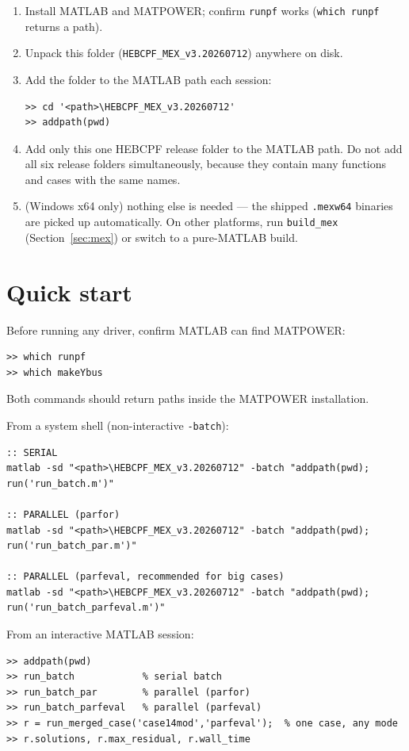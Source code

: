 \documentclass[11pt,a4paper]{article}
\newcommand{\code}[1]{\texttt{#1}}
\begin{document}
\begin{enumerate}[leftmargin=1.6em]
  \item Install MATLAB and MATPOWER; confirm \code{runpf} works
        (\code{which runpf} returns a path).
  \item Unpack this folder (\code{HEBCPF_MEX_v3.20260712}) anywhere on disk.
  \item Add the folder to the MATLAB path each session:
\begin{lstlisting}
>> cd '<path>\HEBCPF_MEX_v3.20260712'
>> addpath(pwd)
\end{lstlisting}
  \item Add only this one HEBCPF release folder to the MATLAB path. Do not add all six
        release folders simultaneously, because they contain many functions and cases with
        the same names.
  \item (Windows x64 only) nothing else is needed --- the shipped \code{.mexw64} binaries
        are picked up automatically. On other platforms, run \code{build_mex}
        (Section~\ref{sec:mex}) or switch to a pure-MATLAB build.
\end{enumerate}

\section{Quick start}

Before running any driver, confirm MATLAB can find MATPOWER:
\begin{lstlisting}[style=mat]
>> which runpf
>> which makeYbus
\end{lstlisting}
Both commands should return paths inside the MATPOWER installation.

From a system shell (non-interactive \code{-batch}):
\begin{lstlisting}[style=sh]
:: SERIAL
matlab -sd "<path>\HEBCPF_MEX_v3.20260712" -batch "addpath(pwd); run('run_batch.m')"

:: PARALLEL (parfor)
matlab -sd "<path>\HEBCPF_MEX_v3.20260712" -batch "addpath(pwd); run('run_batch_par.m')"

:: PARALLEL (parfeval, recommended for big cases)
matlab -sd "<path>\HEBCPF_MEX_v3.20260712" -batch "addpath(pwd); run('run_batch_parfeval.m')"
\end{lstlisting}

From an interactive MATLAB session:
\begin{lstlisting}[style=mat]
>> addpath(pwd)
>> run_batch            % serial batch
>> run_batch_par        % parallel (parfor)
>> run_batch_parfeval   % parallel (parfeval)
>> r = run_merged_case('case14mod','parfeval');  % one case, any mode
>> r.solutions, r.max_residual, r.wall_time
\end{lstlisting}
\end{document}
